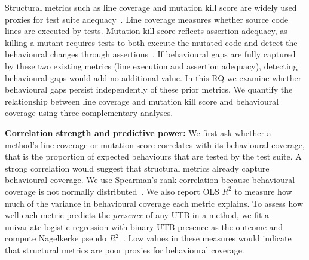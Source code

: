 Structural metrics such as line coverage and mutation kill score are widely used proxies for test suite adequacy~\cite{PAPADAKIS2019275}. Line coverage measures whether source code lines are executed by tests. Mutation kill score reflects assertion adequacy, as killing a mutant requires tests to both execute the mutated code and detect the behavioural changes through assertions~\cite{10.1145/1062455.1062530}. 
If behavioural gaps are fully captured by these two existing metrics (line execution and assertion adequacy), detecting behavioural gaps would add no additional value.
In this RQ we examine whether behavioural gaps persist independently of these prior metrics.
%
\noindent We quantify the relationship between line coverage and mutation kill score and behavioural coverage using three complementary analyses.

\smallskip
\noindent\textbf{Correlation strength and predictive power:} 
We first ask whether a method's line coverage or mutation score correlates with its behavioural coverage, that is the proportion of expected behaviours that are tested by the test suite. A strong correlation would suggest that structural metrics already capture behavioural coverage. 
We use Spearman's rank correlation because behavioural coverage is not normally distributed~\cite{spearman1961proof}. We also report OLS $R^2$ to measure how much of the variance in behavioural coverage each metric explains. 
To assess how well each metric predicts the \emph{presence} of any UTB in a method, we fit a univariate logistic regression with binary UTB presence as the outcome and compute Nagelkerke pseudo $R^2$~\cite{note1991note}. Low values in these measures would indicate that structural metrics are poor proxies for behavioural coverage.

